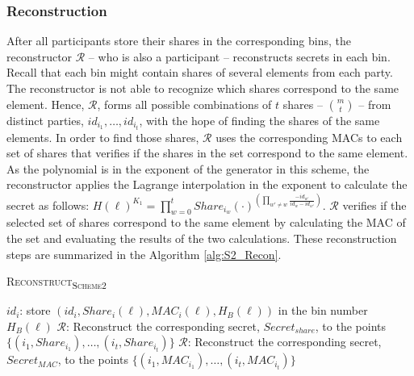 \subsubsection{Reconstruction}\label{Recon_S2}
After all participants store their shares in the corresponding bins, the reconstructor $\mathcal{R}$ -- who is also a participant -- reconstructs secrets in each bin. Recall that each bin might contain shares of several elements from each party. The reconstructor is not able to recognize which shares correspond to the same element. Hence, $\mathcal{R}$, forms all possible combinations of $t$ shares -- $m \choose t$ -- from distinct parties, $id_{i_1}, \dots, id_{i_t}$, with the hope of finding the shares of the same elements. In order to find those shares, $\mathcal{R}$ uses the corresponding MACs to each set of shares that verifies if the shares in the set correspond to the same element. As the polynomial is in the exponent of the generator in this scheme, the reconstructor applies the Lagrange interpolation in the exponent to calculate the secret as follows: $H(\ell)^{K_1} = \prod^t_{w=0} Share_{i_w}(\cdot)^{(\prod_{w' \neq w} \frac{-id_{w'}}{id_w - id_{w'}})}$. $\mathcal{R}$ verifies if the selected set of shares correspond to the same element by calculating the MAC of the set and evaluating the results of the two calculations. These reconstruction steps are summarized in the Algorithm \ref{alg:S2_Recon}. 

\begin{algorithm}[h!]
	 \caption[\textsc{Reconstruct\textsubscript{Scheme2}}]{\textsc{Reconstruct\textsubscript{Scheme2}}}\label{alg:S2_Recon}
	 	\begin{algorithmic}[1]
                    \State $id_i$: store $(id_i, Share_i(\ell), MAC_i(\ell), H_B(\ell))$ in the bin number $H_B(\ell)$
                    \State
	 	        \EndFor
	 	    \EndFor 
	 	            \State $\mathcal{R}$: Reconstruct the corresponding secret, $Secret_{share}$, to the points $\{({i_1}, Share_{i_1}), \dots, ({i_t}, Share_{i_t})\}$
	 	            \State $\mathcal{R}$: Reconstruct the corresponding secret, $Secret_{MAC}$, to the points $\{({i_1}, MAC_{i_1}), \dots, ({i_t}, MAC_{i_t})\}$
	 	            \EndIf 
	 	        \EndFor
	 	    \EndFor
	 	\end{algorithmic}
\end{algorithm}

